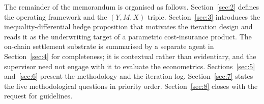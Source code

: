 The remainder of the memorandum is organised as follows.
Section~\ref{sec:2} defines the operating framework and the \((Y, M, X)\)
triple. Section~\ref{sec:3} introduces the inequality-differential hedge
proposition that motivates the iteration design and reads it as the
underwriting target of a parametric cost-insurance product. The on-chain
settlement substrate is summarised by a separate agent in
Section~\ref{sec:4} for completeness; it is contextual rather than
evidentiary, and the supervisor need not engage with it to evaluate the
econometrics. Sections~\ref{sec:5} and~\ref{sec:6} present the methodology
and the iteration log. Section~\ref{sec:7} states the five methodological
questions in priority order. Section~\ref{sec:8} closes with the request
for guidelines.
